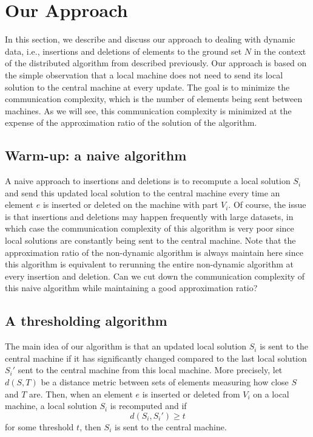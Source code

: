 \section{Our Approach}
\label{s:approach}

In this section, we describe and discuss our approach to dealing with dynamic data, i.e., insertions and deletions of elements to the ground set $N$ in the context of the distributed algorithm from \citet{mirzasoleiman2013distributed} described previously. Our approach is based on the simple observation that a local machine does not need to send its local solution to the central machine at every update. The goal is to minimize the communication complexity, which is the number of elements being sent between machines. As we will see, this communication complexity is minimized at the expense of the approximation ratio of the solution of the algorithm.

\subsection{Warm-up: a naive algorithm} A naive approach to insertions and deletions is to recompute a local solution $S_i$ and send this updated local solution to the central machine every time an element $e$ is inserted or deleted on the machine with part $V_i$. Of course, the issue is that insertions and deletions may happen frequently with large datasets, in which case the communication complexity of this algorithm is very poor since local solutions are constantly being sent to the central machine. Note that the approximation ratio of the non-dynamic algorithm is always maintain here since this algorithm is equivalent to rerunning the entire non-dynamic algorithm at every insertion and deletion. Can we cut down the communication complexity of this naive algorithm while maintaining a good approximation ratio? 

\subsection{A thresholding algorithm} The main idea of our algorithm is that an updated local solution $S_i$ is sent to the central machine if it has significantly changed compared to the last local solution $S_i'$ sent to the central machine from this local machine. More precisely, let $d(S,T)$ be a distance metric between sets of elements measuring how close $S$ and $T$ are. Then, when an element $e$ is inserted or deleted from $V_i$ on a local machine, a local solution $S_i$ is recomputed and if 
%
$$ d(S_i, S_i') \geq t$$
%
for some threshold $t$, then $S_i$ is sent to the central machine. 

